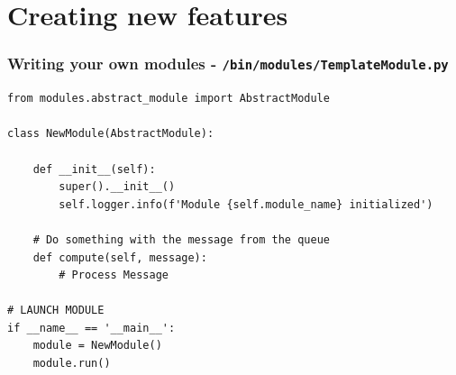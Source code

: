 \documentclass[10pt,aspectratio=169, colorlinks=true, linkcolor=circlBlue]{beamer}
\begin{document}
\section{Creating new features}


\begin{frame}[fragile]
    \frametitle{Writing your own modules - \texttt{/bin/modules/TemplateModule.py}}
    \begin{tcolorbox}[colback=black!85, coltext=green, title=Python Module Example:, fonttitle=\bfseries]
\begin{verbatim}
from modules.abstract_module import AbstractModule

class NewModule(AbstractModule):

    def __init__(self):
        super().__init__()
        self.logger.info(f'Module {self.module_name} initialized')

    # Do something with the message from the queue
    def compute(self, message):
        # Process Message

# LAUNCH MODULE
if __name__ == '__main__':
    module = NewModule()
    module.run()
\end{verbatim}
    \end{tcolorbox}
\end{frame}
\end{document}
